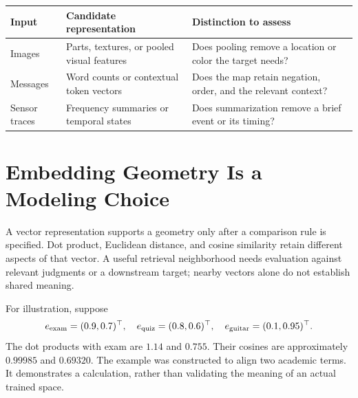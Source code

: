 \par\addvspace{\intextsep}\noindent\begin{minipage}{\linewidth}
\centering\small
\begin{tabular}{@{}L{2.6cm}L{3.6cm}L{3.9cm}@{}}
\toprule
Input & Candidate representation & Distinction to assess \\
\midrule
Images & Parts, textures, or pooled visual features & Does pooling remove a location or color the target needs? \\
Messages & Word counts or contextual token vectors & Does the map retain negation, order, and the relevant context? \\
Sensor traces & Frequency summaries or temporal states & Does summarization remove a brief event or its timing? \\
\bottomrule
\end{tabular}
\label{tab:raw-to-useful-structure}
\end{minipage}\par\addvspace{\intextsep}

\section{Embedding Geometry Is a Modeling Choice}

A vector representation supports a geometry only after a comparison rule is specified. Dot product, Euclidean distance, and cosine similarity retain different aspects of that vector. A useful retrieval neighborhood needs evaluation against relevant judgments or a downstream target; nearby vectors alone do not establish shared meaning.

For illustration, suppose
\[
e_{\rm exam}=(0.9,0.7)^\top,\quad
e_{\rm quiz}=(0.8,0.6)^\top,\quad
e_{\rm guitar}=(0.1,0.95)^\top.
\]
The dot products with exam are $1.14$ and $0.755$. Their cosines are approximately $0.99985$ and $0.69320$. The example was constructed to align two academic terms. It demonstrates a calculation, rather than validating the meaning of an actual trained space.

